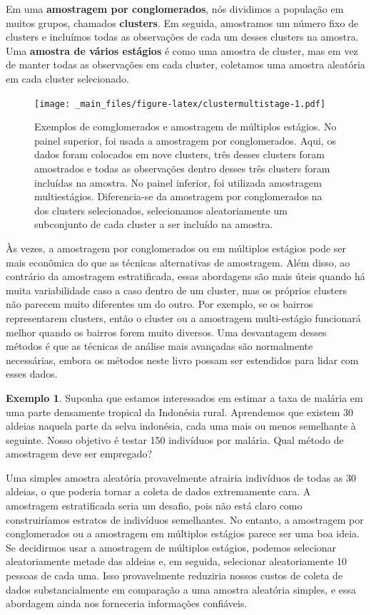 \documentclass[
]{book}
\theoremstyle{definition}
\theoremstyle{definition}
\newtheorem{example}{Exemplo}[chapter]
\theoremstyle{definition}
\theoremstyle{definition}
\theoremstyle{remark}
\begin{document}
Em uma \textbf{amostragem por conglomerados}, nós dividimos a população em muitos grupos, chamados \textbf{clusters}. Em seguida, amostramos um número fixo de clusters e incluímos todas as observações de cada um desses clusters na amostra. Uma \textbf{amostra de vários estágios} é como uma amostra de cluster, mas em vez de manter todas as observações em cada cluster, coletamos uma amostra aleatória em cada cluster selecionado.

\begin{figure}
\centering
\texttt{[image: \_main\_files/figure-latex/clustermultistage-1.pdf]}
\caption{\label{fig:clustermultistage}Exemplos de comglomerados e amostragem de múltiplos estágios. No painel superior, foi usada a amostragem por conglomerados. Aqui, os dados foram colocados em nove clusters, três desses clusters foram amostrados e todas as observações dentro desses três clusters foram incluídas na amostra. No painel inferior, foi utilizada amostragem multiestágios. Diferencia-se da amostragem por conglomerados na dos clusters selecionados, selecionamos aleatoriamente um subconjunto de cada cluster a ser incluído na amostra.}
\end{figure}

Às vezes, a amostragem por conglomerados ou em múltiplos estágios pode ser mais econômica do que as técnicas alternativas de amostragem. Além disso, ao contrário da amostragem estratificada, essas abordagens são mais úteis quando há muita variabilidade caso a caso dentro de um cluster, mas os próprios clusters não parecem muito diferentes um do outro. Por exemplo, se os bairros representarem clusters, então o cluster ou a amostragem multi-estágio funcionará melhor quando os bairros forem muito diversos. Uma desvantagem desses métodos é que as técnicas de análise mais avançadas são normalmente necessárias, embora os métodos neste livro possam ser estendidos para lidar com esses dados.

\begin{example}
\protect\hypertarget{exm:unnamed-chunk-13}{}{\label{exm:unnamed-chunk-13} }Suponha que estamos interessados em estimar a taxa de malária em uma parte densamente tropical da Indonésia rural. Aprendemos que existem 30 aldeias naquela parte da selva indonésia, cada uma mais ou menos semelhante à seguinte. Nosso objetivo é testar 150 indivíduos por malária. Qual método de amostragem deve ser empregado?
\end{example}

Uma simples amostra aleatória provavelmente atrairia indivíduos de todas as 30 aldeias, o que poderia tornar a coleta de dados extremamente cara. A amostragem estratificada seria um desafio, pois não está claro como construiríamos estratos de indivíduos semelhantes. No entanto, a amostragem por conglomerados ou a amostragem em múltiplos estágios parece ser uma boa ideia. Se decidirmos usar a amostragem de múltiplos estágios, podemos selecionar aleatoriamente metade das aldeias e, em seguida, selecionar aleatoriamente 10 pessoas de cada uma. Isso provavelmente reduziria nossos custos de coleta de dados substancialmente em comparação a uma amostra aleatória simples, e essa abordagem ainda nos forneceria informações confiáveis.
\end{document}
